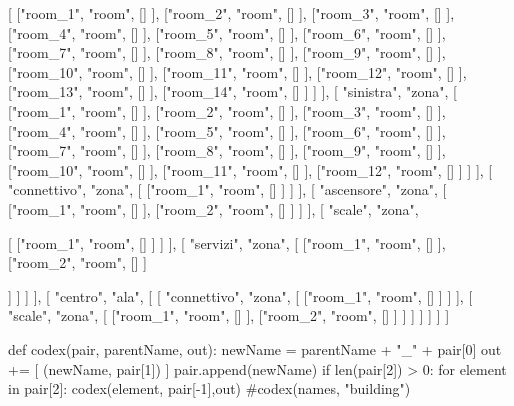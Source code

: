 							[
								["room_1", "room",  [] ],
								["room_2", "room",  [] ],
								["room_3", "room",  [] ],
								["room_4", "room",  [] ],
								["room_5", "room",  [] ],
								["room_6", "room",  [] ],
								["room_7", "room",  [] ],
								["room_8", "room",  [] ],
								["room_9", "room",  [] ],
								["room_10", "room", [] ],
								["room_11", "room", [] ],
								["room_12", "room", [] ],
								["room_13", "room", [] ],
								["room_14", "room", [] ]
							] 
						],
           				[
           					"sinistra",
                            "zona",
           					[
								["room_1", "room",  [] ],
								["room_2", "room",  [] ],
								["room_3", "room",  [] ],
								["room_4", "room",  [] ],
								["room_5", "room",  [] ],
								["room_6", "room",  [] ],
								["room_7", "room",  [] ],
								["room_8", "room",  [] ],
								["room_9", "room",  [] ],
								["room_10", "room", [] ],
								["room_11", "room", [] ],
								["room_12", "room", [] ]
           					]
           				],
           				[
           					"connettivo",
                            "zona",
           					[
								["room_1", "room",  [] ]
           					]
           				],
           				[
           					"ascensore",
                            "zona",
           					[
								["room_1", "room",  [] ],
								["room_2", "room",  [] ]
           					]
           				],
          				[
          					"scale",
                            "zona",
                         
          					[
								["room_1", "room",  [] ]
          					]
          				],
           				[
           					"servizi",
                            "zona",
           					[
								["room_1", "room",  [] ],
								["room_2", "room",  [] ]

           					]												
						]
					]
				],
				[
					"centro",
                    "ala",
					[
           				[
           					"connettivo",
                            "zona",
           					[
								["room_1", "room",  [] ]
           					]
           				],
          				[
          					"scale",
                            "zona",
          					[
								["room_1", "room",  [] ],
								["room_2", "room",  [] ]
          					]
          				]
					]
				]
			]
		]

def codex(pair, parentName, out):
	newName = parentName + "_" + pair[0]
	out += [ (newName, pair[1]) ]
	pair.append(newName)
	if len(pair[2]) > 0:
		for element in pair[2]:
			codex(element, pair[-1],out)
#codex(names, "building")

